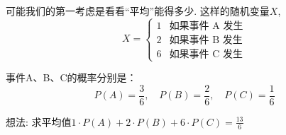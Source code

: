 可能我们的第一考虑是看看``平均''能得多少. 这样的随机变量$X$, \[
    X =
    \begin{cases}
    1 & \text{如果事件 A 发生} \\
    2 & \text{如果事件 B 发生} \\
    6 & \text{如果事件 C 发生}
    \end{cases}
    \]
    
    事件A、B、C的概率分别是：
    \[P(A) = \frac{3}{6}, \quad P(B) = \frac{2}{6}, \quad P(C) = \frac{1}{6}\]
    
    想法: 求平均值$1 \cdot P(A) + 2 \cdot P(B) + 6 \cdot P(C)= \frac{13}{6}$







